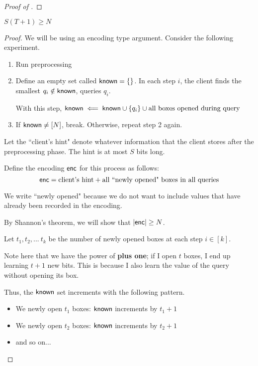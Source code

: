 \begin{proof}[Proof of ]
\end{proof}





\begin{theorem}
    $S(T+1) \ge N$ 
\end{theorem}
\begin{proof}
    We will be using an encoding type argument. Consider the following experiment.
    \begin{enumerate}
        \item Run preprocessing
        \item Define an empty set called ${\sf known} = \{\}$. In each step $i$, the client finds the smallest $q_i \notin {\sf known}$, queries $q_i$.

        With this step, ${\sf known} \impliedby {\sf known} \cup \{q_i\} \cup {\text{all boxes opened during query}}$
        \item If ${\sf known} \neq [N]$, break. Otherwise, repeat step 2 again.
    \end{enumerate}

    Let the ``client's hint" denote whatever information that the client stores after the preprocessing phase. The hint is at most $S$ bits long.
    
    Define the encoding ${\sf enc}$ for this process as follows: 
    \[{\sf enc} = \text{client's hint} + \text{all ``newly opened" boxes in all queries}\]

    We write ``newly opened" because we do not want to include values that have already been recorded in the encoding.
    \vspace{5mm}
    
    By Shannon's theorem, we will show that $|{\sf enc}| \ge N$.

    Let $t_1, t_2, ...\ t_k$ be the number of newly opened boxes at each step $i \in [k]$. 
    
    Note here that we have the power of \textbf{plus one}; if I open $t$ boxes, I end up learning $t+1$ new bits. This is because I also learn the value of the query without opening its box.

    Thus, the ${\sf known}$ set increments with the following pattern.

    \begin{itemize}
        \item We newly open $t_1$ boxes: ${\sf known}$ increments by $t_1 + 1$
        \item We newly open $t_2$ boxes: ${\sf known}$ increments by $t_2 + 1$
        \item and so on...
    \end{itemize}


\end{proof}
